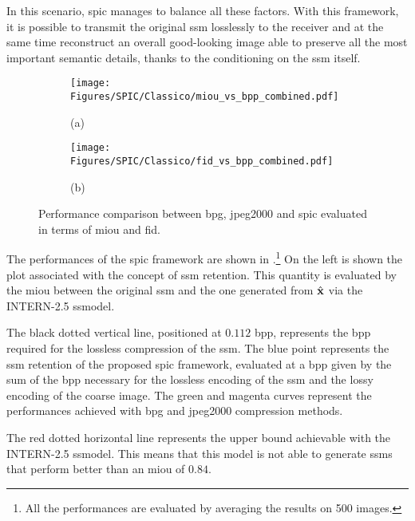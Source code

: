 In this scenario, \gls{spic} manages to balance all these factors. With this framework, it is possible to transmit the original \gls{ssm} losslessly to the receiver and at the same time reconstruct an overall good-looking image able to preserve all the most important semantic details, thanks to the conditioning on the \gls{ssm} itself.
\begin{figure}[!t]
    \centering
    \begin{subfigure}[t]{0.49\textwidth}
        \centering
        \texttt{[image: Figures/SPIC/Classico/miou\_vs\_bpp\_combined.pdf]}
        \caption*{(a)} %
    \end{subfigure}%
    \begin{subfigure}[t]{0.49\textwidth}
        \centering
        \texttt{[image: Figures/SPIC/Classico/fid\_vs\_bpp\_combined.pdf]}
        \caption*{(b)}
    \end{subfigure}
    \caption[Performance comparison between the \acrshort{spic} and classical compression algorithms]{Performance comparison between \acrshort{bpg}, \acrshort{jpeg2000} and \acrshort{spic} evaluated in terms of \acrshort{miou} and \acrshort{fid}.}
    \label{fig: SPIC spic metrics comparison}
\end{figure}

The performances of the \gls{spic} framework are shown in .\footnote{All the performances are evaluated by averaging the results on 500 images.} On the left is shown the plot associated with the concept of \gls{ssm} retention. This quantity is evaluated by the \gls{miou} between the original \gls{ssm} and the one generated from $\hat{\mathbf{x}}$ via the INTERN-2.5 \gls{ssmodel}.

The black dotted vertical line, positioned at $0.112$ \gls{bpp}, represents the \gls{bpp} required for the lossless compression of the \gls{ssm}. The blue point represents the \gls{ssm} retention of the proposed \gls{spic} framework, evaluated at a \gls{bpp} given by the sum of the \gls{bpp} necessary for the lossless encoding of the \gls{ssm} and the lossy encoding of the coarse image. The green and magenta curves represent the performances achieved with \gls{bpg} and \gls{jpeg2000} compression methods.

The red dotted horizontal line represents the upper bound achievable with the INTERN-2.5 \gls{ssmodel}. This means that this model is not able to generate \glspl{ssm} that perform better than an \gls{miou} of $0.84$.

